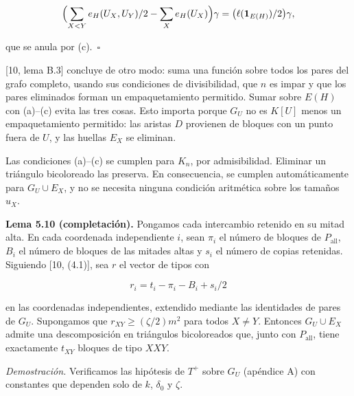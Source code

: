 \documentclass[spanish,11pt,a4paper]{article}
\begin{document}
\nopagebreak[4]
\[\Bigl(\sum_{X<Y}e_H(U_X,U_Y)/2-\sum_Xe_H(U_X)\Bigr)\gamma=\bigl(\ell(\mathbf 1_{E(H)})/2\bigr)\gamma,\]

que se anula por (c).~\(\square\)

{[}10, lema B.3{]} concluye de otro modo: suma una función sobre todos los pares del grafo completo, usando sus condiciones de divisibilidad, que \(n\) es impar y que los pares eliminados forman un empaquetamiento permitido. Sumar sobre \(E(H)\) con (a)--(c) evita las tres cosas. Esto importa porque \(G_U\) no es \(K[U]\) menos un empaquetamiento permitido: las aristas \(D\) provienen de bloques con un punto fuera de \(U\), y las huellas \(E_X\) se eliminan.

Las condiciones (a)--(c) se cumplen para \(K_n\), por admisibilidad. Eliminar un triángulo bicoloreado las preserva. En consecuencia, se cumplen automáticamente para \(G_U\cup E_X\), y no se necesita ninguna condición aritmética sobre los tamaños \(u_X\).

\textbf{Lema 5.10 (completación).} Pongamos cada intercambio retenido en su mitad alta. En cada coordenada independiente \(i\), sean \(\pi_i\) el número de bloques de \(P_{\mathrm{all}}\), \(B_i\) el número de bloques de las mitades altas y \(s_i\) el número de copias retenidas. Siguiendo {[}10, (4.1){]}, sea \(r\) el vector de tipos con

\nopagebreak[4]
\[r_i=t_i-\pi_i-B_i+s_i/2\]

en las coordenadas independientes, extendido mediante las identidades de pares de \(G_U\). Supongamos que \(r_{XY}\ge(\zeta/2)m^2\) para todos \(X\ne Y\). Entonces \(G_U\cup E_X\) admite una descomposición en triángulos bicoloreados que, junto con \(P_{\mathrm{all}}\), tiene exactamente \(t_{XY}\) bloques de tipo \(XXY\).

\emph{Demostración.} Verificamos las hipótesis de \(T^+\) sobre \(G_U\) (apéndice A) con constantes que dependen solo de \(k\), \(\delta_0\) y \(\zeta\).
\end{document}
